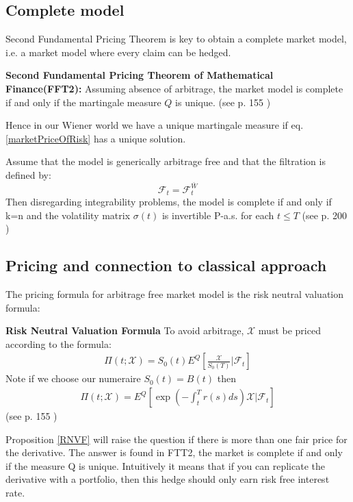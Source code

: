 \subsection{Complete model}
Second Fundamental Pricing Theorem is key to obtain a complete market model, i.e. a market model where every claim can be hedged.
\begin{theorem}\label{FFT2}
\textbf{Second Fundamental Pricing Theorem of Mathematical Finance(FFT2): } Assuming absence of arbitrage, the market model is complete if and only if the martingale measure $Q$ is unique.
(see p. 155 \parencite{finKont})
\end{theorem}
Hence in our Wiener world we have a unique martingale measure if eq. \ref{marketPriceOfRisk} has a unique solution. 

\begin{proposition}{}\label{completeProp}
Assume that the model is generically arbitrage free and that the filtration is defined by:
$$\mathcal{F}_t=\mathcal{F}_t^{\bar{W}}$$
Then disregarding integrability problems, the model is complete if and only if k=n and the volatility matrix $\sigma(t)$ is invertible P-a.s. for each $t \leq T$
(see p. 200 \parencite{finKont})
\end{proposition}


\subsection{Pricing and connection to classical approach}
The pricing formula for arbitrage free market model is the risk neutral valuation formula:
\begin{proposition}{\textbf{Risk Neutral Valuation Formula}}\label{RNVF}
To avoid arbitrage, $\mathcal{X}$ must be priced according to the formula:
\begin{align}
\Pi(t;\mathcal{X})=S_0(t)E^Q[\frac{\mathcal{X}}{S_0(T)}|\mathcal{F}_t]
\end{align}
Note if we choose our numeraire $S_0(t)=B(t)$ then
\begin{align}
\Pi(t;\mathcal{X})=E^Q[\exp(-\int_t^T r(s) ds) \mathcal{X}|\mathcal{F}_t]
\end{align}
(see p. 155 \parencite{finKont})
\end{proposition}
Proposition \ref{RNVF} will raise the question if there is more than one fair price for the derivative. The answer is found in FTT2, the market is complete if and only if the measure Q is unique. Intuitively it means that if you can replicate the derivative with a portfolio, then this hedge should only earn risk free interest rate. \\

